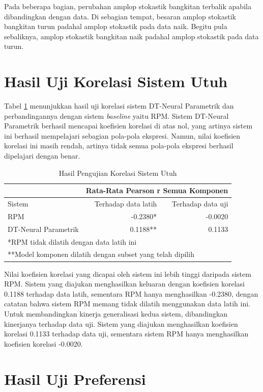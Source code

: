 Pada beberapa bagian, perubahan amplop stokastik bangkitan terbalik apabila dibandingkan dengan data. Di sebagian tempat, besaran amplop stokastik bangkitan turun padahal amplop stokastik pada data naik. Begitu pula sebaliknya, amplop stokastik bangkitan naik padahal amplop stokastik pada data turun. %


\section{Hasil Uji Korelasi Sistem Utuh}
Tabel \ref{tab-system-testing-results} menunjukkan hasil uji korelasi sistem DT-Neural Parametrik dan perbandingannya dengan sistem \textit{baseline} yaitu RPM. Sistem DT-Neural Parametrik berhasil mencapai koefisien korelasi di atas nol, yang artinya sistem ini berhasil mempelajari sebagian pola-pola ekspresi. Namun, nilai koefisien korelasi ini masih rendah, artinya tidak semua pola-pola ekspresi berhasil dipelajari dengan benar.

\begin{table}[htbp]
    \centering
    \caption{Hasil Pengujian Korelasi Sistem Utuh}\label{tab-system-testing-results}
    \begin{tabular}{ |l|r|r| } 
     \cline{2-3}
     \multicolumn{1}{l|}{}&\multicolumn{2}{|l|}{Rata-Rata Pearson r Semua Komponen}\\\hline
     Sistem&Terhadap data latih&Terhadap data uji\\\hline
	 RPM&-0.2380* &-0.0020\\\hline
	 DT-Neural Parametrik& 0.1188**&0.1133\\\hline
	 \multicolumn{3}{l}{*RPM tidak dilatih dengan data latih ini}\\
	 \multicolumn{3}{l}{**Model komponen dilatih dengan subset yang telah dipilih}\\
    \end{tabular}
\end{table}

Nilai koefisien korelasi yang dicapai oleh sistem ini lebih tinggi daripada sistem RPM. Sistem yang diajukan menghasilkan keluaran dengan koefisien korelasi 0.1188 terhadap data latih, sementara RPM hanya menghasilkan -0.2380, dengan catatan bahwa sistem RPM memang tidak dilatih menggunakan data latih ini. Untuk membandingkan kinerja generalisasi kedua sistem, dibandingkan kinerjanya terhadap data uji. Sistem yang diajukan menghasilkan koefisien korelasi 0.1133 terhadap data uji, sementara sistem RPM hanya menghasilkan koefisien  korelasi -0.0020.




\section{Hasil Uji Preferensi}
\blindtext